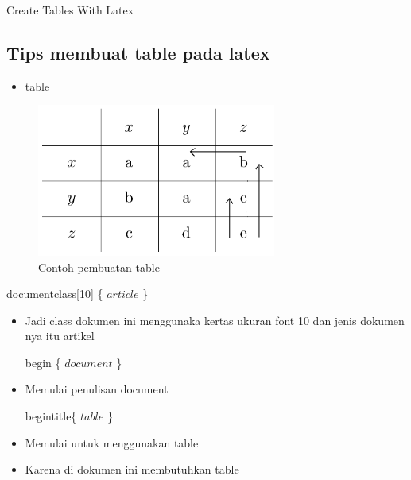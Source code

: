 
\sloppy

\noindent \begin{center}
	Create Tables With Latex
\end{center}
\subsection{Tips membuat table pada latex}
\begin{itemize}
	\item table
\end{itemize}
\begin{figure}[ht]
	\centerline{\includegraphics[width=0.70\textwidth]{gambar/isal2}}
	\caption{Contoh pembuatan table}
	\label{table latex}
\end{figure}

\noindent documentclass[10] \{ $article$ \} \par

\begin{itemize}
	\vspace{\baselineskip}
	\vspace{\baselineskip}
	\item Jadi class dokumen ini menggunaka kertas ukuran font 10 dan jenis dokumen nya itu artikel\par
\vspace{\baselineskip}
begin \{ $document$ \} \par
\vspace{\baselineskip}
	\item Memulai penulisan document\par
\vspace{\baselineskip}
begintitle\{ $table$ \} \par
\vspace{\baselineskip}
	\item Memulai untuk menggunakan table\par
\vspace{\baselineskip}
	\item Karena di dokumen ini membutuhkan table
	\vspace{\baselineskip}
\end{itemize}\par


